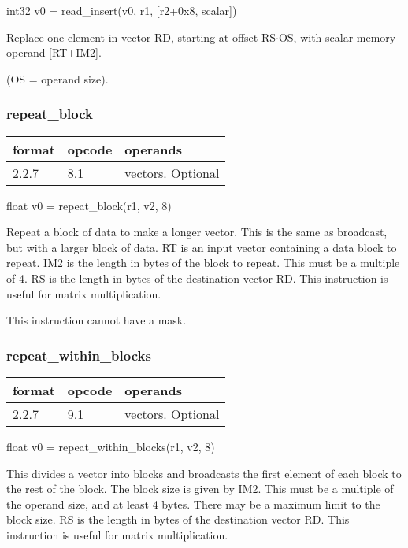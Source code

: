 \documentclass[forwardcom.tex]{subfiles}
\begin{document}
int32 v0 = read\_insert(v0, r1, [r2+0x8, scalar])
\vspace{2mm}

Replace one element in vector RD, starting
at offset RS$\cdot$OS, with scalar memory operand
[RT+IM2].

(OS = operand size).

\subsubsection{repeat\_block}
\label{table:repeatBlockInstruction}
\begin{tabular}{|p{12mm}|p{12mm}|p{110mm}|}
\hline
\bfseries format & \bfseries opcode & \bfseries operands \\ \hline
2.2.7 & 8.1 & vectors. Optional \\ \hline
\end{tabular}
\vspace{2mm}

float v0 = repeat\_block(r1, v2, 8) 
\vspace{2mm}

Repeat a block of data to make a longer vector. This is the same as broadcast, but with a larger block of data. RT is an input vector containing a data block to repeat. IM2 is the length in bytes of the block to repeat. This must be a multiple of 4. RS is the length in bytes of the destination vector RD. This instruction is useful for matrix multiplication.
\vspace{2mm}

This instruction cannot have a mask.

\subsubsection{repeat\_within\_blocks}
\label{table:repeatWithinBlockInstruction}
\begin{tabular}{|p{12mm}|p{12mm}|p{110mm}|}
\hline
\bfseries format & \bfseries opcode & \bfseries operands \\ \hline
2.2.7 & 9.1 & vectors. Optional \\ \hline
\end{tabular}
\vspace{2mm}

float v0 = repeat\_within\_blocks(r1, v2, 8) 
\vspace{2mm}

This divides a vector into blocks and broadcasts the first element of each block to the rest of the block. The block size is given by IM2. This must be a multiple of the operand size, and at least 4 bytes. There may be a maximum limit to the block size. RS is the length in bytes of the destination vector RD. This instruction is useful for matrix multiplication.
\vspace{2mm}
\end{document}
